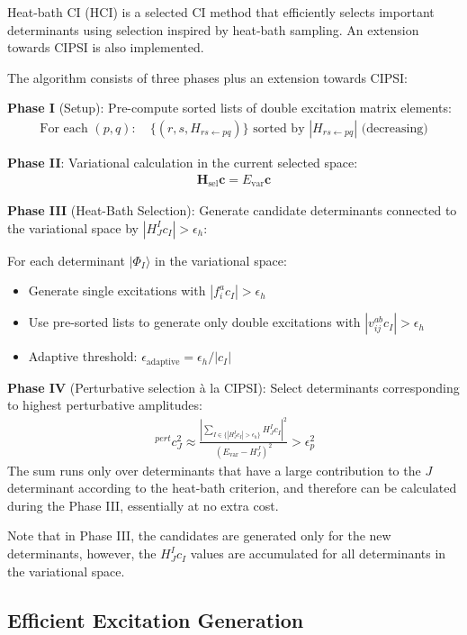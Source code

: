 \documentclass[a4paper,12pt,oneside]{book}
\newcommand{\beq}{\begin{equation}\begin{aligned}}
\newcommand{\eeq}{\end{aligned}\end{equation}}
\newcommand{\mat}{\mathbf}
\newcommand{\vect}{\mathbf}
\newcommand{\pre}[1]{\,#1\!}
\begin{document}
Heat-bath CI (HCI)\cite{holmes16_hci} is a selected CI method that efficiently selects 
important determinants using selection inspired by heat-bath sampling.
An extension towards CIPSI\cite{huron73_cipsi} is also implemented.

The algorithm consists of three phases plus an extension towards CIPSI:

\textbf{Phase I} (Setup): Pre-compute sorted lists of double excitation matrix elements:
\beq
\text{For each } (p,q): \quad \{(r,s,H_{rs \leftarrow pq})\} 
    \text{ sorted by } |H_{rs \leftarrow pq}| \text{ (decreasing)}
\eeq

\textbf{Phase II}: Variational calculation in the current selected space:
\beq
\mat{H}_{\text{sel}} \vect{c} = E_{\text{var}} \vect{c}
\eeq

\textbf{Phase III} (Heat-Bath Selection): Generate candidate determinants connected to the variational 
space by $|H_{J}^I c_I| \gt \epsilon_h$:


For each determinant $|\Phi_I\rangle$ in the variational space:
\begin{itemize}
\item Generate single excitations with $|f_{i}^{a} c_I| \gt \epsilon_h$
\item Use pre-sorted lists to generate only double excitations with $|v_{ij}^{ab} c_I| \gt \epsilon_h$
\item Adaptive threshold: $\epsilon_{\text{adaptive}} = \epsilon_h / |c_I|$
\end{itemize}

\textbf{Phase IV} (Perturbative selection à la CIPSI): Select determinants corresponding to 
highest perturbative amplitudes:
\beq
\pre{^{pert}} c_J^2 \approx \frac{\left|\sum_{I \in \{|H_{J}^I c_I| \gt \epsilon_h\}} H^I_{J} c_I\right|^2}{(E_{\text{var}} - H^J_{J})^2} \gt \epsilon_p^2
\eeq
The sum runs only over determinants that have a large contribution to the $J$ determinant
according to the heat-bath criterion, and therefore can be calculated during the Phase III,
essentially at no extra cost.

Note that in Phase III, the candidates are generated only for the new determinants, however,
the $H_{J}^I c_I$ values are accumulated for all determinants in the variational space.

\subsection{Efficient Excitation Generation}
\end{document}
